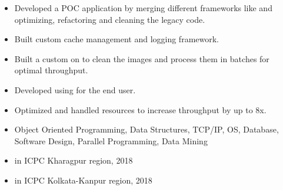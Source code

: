 \documentclass[10pt,a4paper,ragged2e, normalphoto]{altacv}
\begin{document}
\begin{itemize}
  \item Developed a POC application by merging different frameworks like and optimizing, refactoring and cleaning the legacy code.
  \item Built custom cache management and logging framework.
 \end{itemize}
\vspace{10pt}
\begin{itemize}
  \item Built a custom on to clean the images and process them in batches for optimal throughput.
  \item Developed using for the end user.
  \item Optimized and handled resources to increase throughput by up to 8x.
 \end{itemize}
 
 
\begin{itemize}
  \item {} Object Oriented Programming, Data Structures, TCP/IP, OS, Database, Software Design, Parallel Programming, Data Mining%
\end{itemize}


\begin{itemize}
    \item {}in ICPC Kharagpur region, 2018
    \item {}in ICPC Kolkata-Kanpur region, 2018
 \end{itemize}
\end{document}
